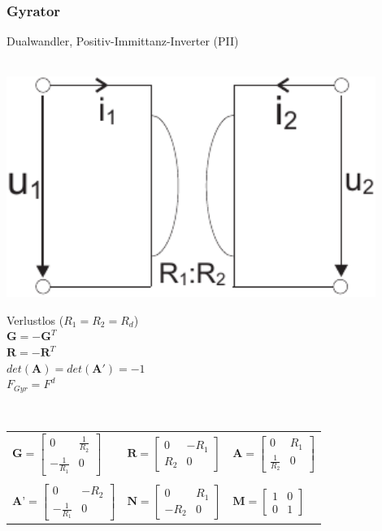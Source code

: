 \documentclass[a4paper,twocolumn,10pt]{article}
\begin{document}
\subsubsection*{Gyrator}
Dualwandler, Positiv-Immittanz-Inverter (PII)\\\\
\begin{minipage}[b]{0.2\textwidth}
\includegraphics[width=0.9\textwidth]{Grafiken/OP_Gyrator}
\end{minipage}
\hfill
\begin{minipage}[b]{0.26\textwidth}
Verlustlos ($R_1=R_2=R_d$)\\
$\textbf{G}=-\textbf{G}^T$\\
$\textbf{R}=-\textbf{R}^T$\\
$det(\textbf{A})=det(\textbf{A}')=-1$\\
$F_{Gyr}=F^d$
\end{minipage}\\

\begin{tabular}{lll}
$\textbf{G}=\begin{bmatrix}0 & \frac{1}{R_2}\\ -\frac{1}{R_1} & 0\end{bmatrix}$ & $\textbf{R}=\begin{bmatrix}0 & -R_1\\ R_2 & 0\end{bmatrix}$ & $\textbf{A}=\begin{bmatrix}0 & R_1\\ \frac{1}{R_2} & 0\end{bmatrix}$\\\\
$\textbf{A'}=\begin{bmatrix}0 & -R_2\\ -\frac{1}{R_1} & 0\end{bmatrix}$ & $\textbf{N}=\begin{bmatrix}0 & R_1\\ -R_2 & 0\end{bmatrix}$ & $\textbf{M}=\begin{bmatrix}1 & 0\\ 0 & 1\end{bmatrix}$
\end{tabular}
\end{document}
